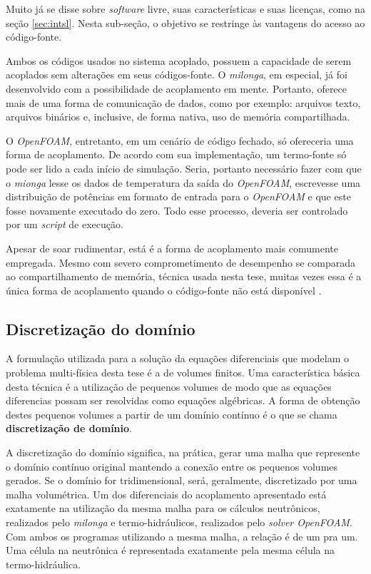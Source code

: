 Muito já se disse sobre \textit{software} livre, suas características e suas licenças, como na
seção \ref{sec:intsl}. Nesta sub-seção, o objetivo se restringe às vantagens do acesso ao
código-fonte.

Ambos os códigos usados no sistema acoplado, possuem a capacidade de serem acoplados sem alterações
em seus códigos-fonte. O \textit{milonga}, em especial, já foi desenvolvido com a possibilidade
de acoplamento em mente. Portanto, oferece mais de uma forma de comunicação de dados, como por exemplo:
arquivos texto, arquivos binários e, inclusive, de forma nativa, uso de memória compartilhada.

O \textit{OpenFOAM}, entretanto, em um cenário de código fechado, só ofereceria uma forma de
acoplamento. De acordo com sua implementação, um termo-fonte só pode ser lido a cada início de
simulação. Seria, portanto necessário fazer com que o \textit{mionga} lesse os dados de temperatura
da saída do \textit{OpenFOAM}, escrevesse uma distribuição de potências em formato de entrada
para o \textit{OpenFOAM} e que este fosse novamente executado do zero. Todo esse processo, deveria
ser controlado por um \textit{script} de execução.

Apesar de soar rudimentar, está é a forma de acoplamento mais comumente empregada.
Mesmo com severo comprometimento de desempenho se comparada ao compartilhamento de
memória, técnica usada nesta tese, muitas vezes essa é a única forma de acoplamento
quando o código-fonte não está disponível \cite{Hummel2016}.

\subsection{Discretização do domínio}
\label{subsec:dd}

A formulação utilizada para a solução da equações diferenciais que modelam o problema multi-física desta
tese é a de volumes finitos. Uma característica básica desta técnica é a utilização de pequenos volumes
de modo que as equações diferencias possam ser resolvidas como equações algébricas. A forma de obtenção
destes pequenos volumes a partir de um domínio contínuo é o que se chama \textbf{discretização de domínio}. 

A discretização do domínio significa, na prática, gerar uma malha que represente o domínio contínuo original
mantendo a conexão entre os pequenos volumes gerados. Se o domínio for tridimensional, será, geralmente,
discretizado por uma malha volumétrica. Um dos diferenciais do acoplamento apresentado está exatamente na
utilização da mesma malha para os cálculos neutrônicos, realizados pelo \textit{milonga} e termo-hidráulicos,
realizados pelo \textit{solver OpenFOAM}. Com ambos os programas utilizando a mesma malha, a relação é de um
pra um. Uma célula na neutrônica é representada exatamente pela mesma célula na termo-hidráulica.

